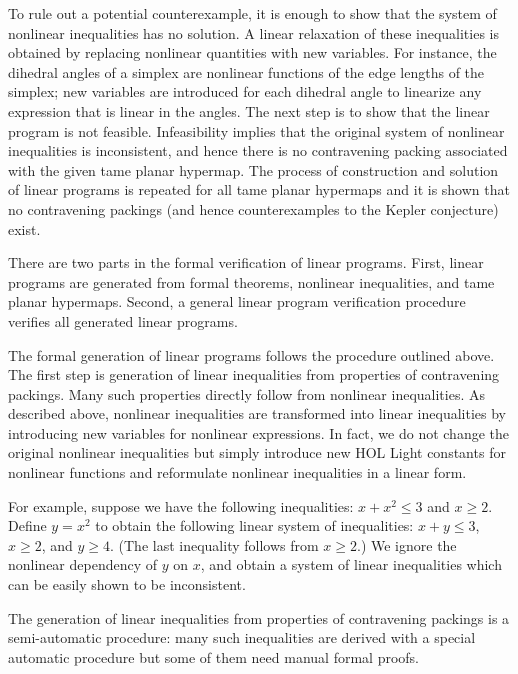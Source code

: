 To rule out a potential counterexample, it is enough to show that the
system of nonlinear inequalities has no solution.  A linear relaxation
of these inequalities is obtained by replacing nonlinear quantities
with new variables. For instance, the dihedral angles of a simplex are
nonlinear functions of the edge lengths of the simplex; new variables
are introduced for each dihedral angle to linearize any expression that
is linear in the angles.  The next step is to show that
the linear program is not feasible. Infeasibility implies that the original
system of nonlinear inequalities is inconsistent, and hence there is
no contravening packing associated with the given tame planar
hypermap. The process of construction and solution of linear programs
is repeated for all tame planar hypermaps and it is shown that no
contravening packings (and hence counterexamples to the Kepler
conjecture) exist.

There are two parts in the formal verification of linear
programs. First, linear programs are generated from formal theorems,
nonlinear inequalities, and tame planar hypermaps. Second, a general linear
program verification procedure verifies all generated linear programs.

The formal generation of linear programs follows the procedure
outlined above. The first step is generation of linear inequalities
from properties of contravening packings. Many such properties
directly follow from nonlinear inequalities. As described above,
nonlinear inequalities are transformed into linear inequalities by
introducing new variables for nonlinear expressions. In fact, we do
not change the original nonlinear inequalities but simply introduce
new HOL Light constants for nonlinear functions and reformulate
nonlinear inequalities in a linear form.

For example, suppose we have the following inequalities: $x +
x^2 \le 3$ and $x \ge 2$. Define $y = x^2$ to obtain the following
linear system of inequalities: $x + y \le 3$, $x \ge 2$, and $y \ge 4$.
(The last inequality follows from $x \ge 2$.)  We
ignore the nonlinear dependency of $y$ on $x$, and obtain a system of linear
inequalities which can be easily shown to be inconsistent.

The generation of linear inequalities from properties of contravening packings is
a semi-automatic procedure: many such inequalities are derived with a special
automatic procedure but some of them need manual formal proofs.

